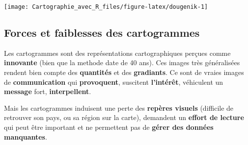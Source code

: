\documentclass[]{book}
\newenvironment{Shaded}{\begin{snugshade}}{\end{snugshade}}
\newcommand{\KeywordTok}[1]{\textcolor[rgb]{0.13,0.29,0.53}{\textbf{#1}}}
\newcommand{\DataTypeTok}[1]{\textcolor[rgb]{0.13,0.29,0.53}{#1}}
\newcommand{\StringTok}[1]{\textcolor[rgb]{0.31,0.60,0.02}{#1}}
\newcommand{\CommentTok}[1]{\textcolor[rgb]{0.56,0.35,0.01}{\textit{#1}}}
\newcommand{\OtherTok}[1]{\textcolor[rgb]{0.56,0.35,0.01}{#1}}
\newcommand{\NormalTok}[1]{#1}
\begin{document}
\begin{Shaded}
\end{Shaded}

\begin{center}\texttt{[image: Cartographie\_avec\_R\_files/figure-latex/dougenik-1]} \end{center}

\subsection{Forces et faiblesses des
cartogrammes}\label{forces-et-faiblesses-des-cartogrammes}

Les cartogrammes sont des représentations cartographiques perçues comme
\textbf{innovante} (bien que la methode date de 40 ans). Ces images très
généralisées rendent bien compte des \textbf{quantités} et des
\textbf{gradiants}. Ce sont de vraies images de \textbf{communication}
qui \textbf{provoquent}, suscitent \textbf{l'intérêt}, véhiculent un
\textbf{message} fort, \textbf{interpellent}.

Mais les cartogrammes induisent une perte des \textbf{repères visuels}
(difficile de retrouver son pays, ou sa région sur la carte), demandent
un \textbf{effort de lecture} qui peut être important et ne permettent
pas de \textbf{gérer des données manquantes}.
\end{document}
